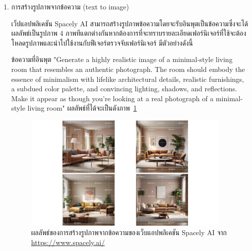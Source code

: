 \documentclass[12pt,oneside,openright,a4paper]{cpe-thai-project}
\begin{document}
\begin{enumerate}
\item การสร้างรูปภาพจากข้อความ (text to image)  
\par \hspace {18pt} เว็ปแอปพลิเคชัน Spacely AI สามารถสร้างรูปภาพข้อความโดยจะรับอินพุตเป็นข้อความซึ่งจะได้ผลลัพธ์เป็นรูปภาพ 4 ภาพทีแตกต่างกันหากต้องการที่จะทราบรายละเอียดเฟอร์นิเจอร์ที่ใช้จะต้องโหลดรูปภาพและนำไปใช้งานกับฟีเจอร์ตรวจจับเฟอร์นิเจอร์ มีตัวอย่างดังนี้ 
\par 
ข้อความที่อินพุต "Generate a highly realistic image of a minimal-style living room that resembles an authentic photograph. The room should embody the essence of minimalism with lifelike architectural details, realistic furnishings, a subdued color palette, and convincing lighting, shadows, and reflections. Make it appear as though you're looking at a real photograph of a minimal-style living room"
ผลลัพธ์ที่ได้จะเป็นดังภาพ~\ref{fig:spacely-gen}

\vspace{\fill}\clearpage

\begin{figure}[!h]\centering
\includegraphics[width=10cm]{image/spacely-gen.jpg}
\caption{ผลลัพธ์ของการสร้างรูปภาพจากข้อความของเว็บแอปพลิเคชัน Spacely AI จาก \url{https://www.spacely.ai/}}
\label{fig:spacely-gen}
\end{figure}


\end{enumerate}
\end{document}
